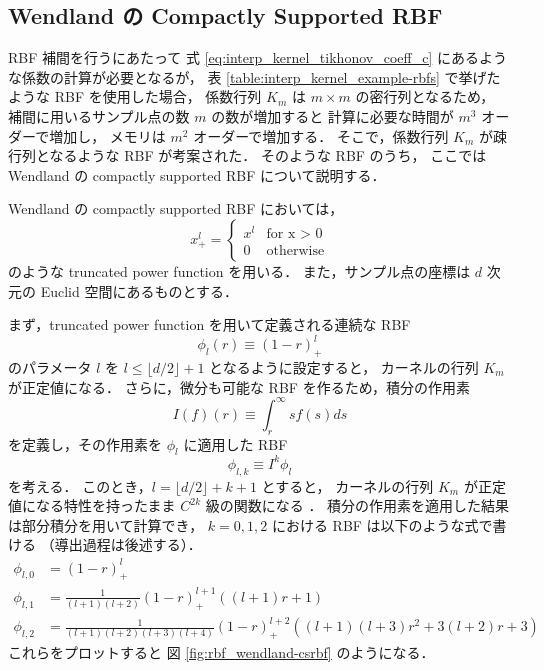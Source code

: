 \subsection{Wendland の Compactly Supported RBF}

RBF 補間を行うにあたって
式 \eqref{eq:interp_kernel_tikhonov_coeff_c} にあるような係数の計算が必要となるが，
表 \ref{table:interp_kernel_example-rbfs}
で挙げたような RBF を使用した場合，
係数行列 $K_m$ は $m \times m$ の密行列となるため，
補間に用いるサンプル点の数 $m$ の数が増加すると
計算に必要な時間が $m^3$ オーダーで増加し，
メモリは $m^2$ オーダーで増加する．
そこで，係数行列 $K_m$ が疎行列となるような RBF が考案された．
そのような RBF のうち，
ここでは Wendland の compactly supported RBF \cite{Wendland1995} について説明する．

Wendland の compactly supported RBF においては，
\begin{equation}
    x_+^l = \begin{cases}
        x^l & \text{for x > 0} \\
        0   & \text{otherwise}
    \end{cases}
\end{equation}
のような truncated power function を用いる．
また，サンプル点の座標は $d$ 次元の Euclid 空間にあるものとする．

まず，truncated power function を用いて定義される連続な RBF
\begin{equation}
    \phi_l(r) \equiv (1 - r)_+^l
\end{equation}
のパラメータ $l$ を $l \le \lfloor d/2 \rfloor + 1$ となるように設定すると，
カーネルの行列 $K_m$ が正定値になる．
さらに，微分も可能な RBF を作るため，積分の作用素
\begin{equation}
    I(f)(r) \equiv \int_r^\infty sf(s) ds
\end{equation}
を定義し，その作用素を $\phi_l$ に適用した RBF
\begin{equation}
    \phi_{l,k} \equiv I^k \phi_l \label{eq:rbf_wendland-csrbf_definition}
\end{equation}
を考える．
このとき，$l = \lfloor d/2 \rfloor + k + 1$ とすると，
カーネルの行列 $K_m$ が正定値になる特性を持ったまま
$C^{2k}$ 級の関数になる \cite[Theorem 3.5]{Wendland1995}．
積分の作用素を適用した結果は部分積分を用いて計算でき，
$k = 0, 1, 2$ における RBF は以下のような式で書ける
（導出過程は後述する）．
\begin{align}
    \phi_{l,0} & = (1 - r)_+^l
    \label{eq:rbf_wendland-csrbf_formula0}                                        \\
    \phi_{l,1} & = \frac{1}{(l+1)(l+2)} (1 - r)_+^{l+1} \left( (l+1)r + 1 \right)
    \label{eq:rbf_wendland-csrbf_formula1}                                        \\
    \phi_{l,2} & = \frac{1}{(l+1)(l+2)(l+3)(l+4)} (1 - r)_+^{l+2}
    \left( (l+1)(l+3)r^2 + 3(l+2)r + 3 \right)
    \label{eq:rbf_wendland-csrbf_formula2}
\end{align}
これらをプロットすると
図 \ref{fig:rbf_wendland-csrbf}
のようになる．

